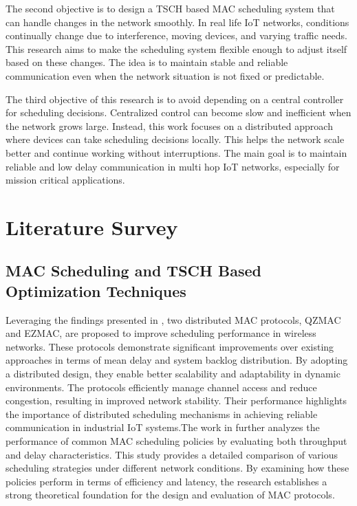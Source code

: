 \documentclass[a4paper,fleqn]{cas-dc}
\numberwithin{equation}{section}
\begin{document}
 The second objective is to design a TSCH based MAC scheduling system that can handle changes in the network smoothly. In real life IoT networks, conditions continually change due to interference, moving devices, and varying traffic needs. This research aims to make the scheduling system flexible enough to adjust itself based on these changes. The idea is to maintain stable and reliable communication even when the network situation is not fixed or predictable.
 
The third objective of this research is to avoid depending on a central controller for scheduling decisions. Centralized control can become slow and inefficient when the network grows large. Instead, this work focuses on a distributed approach where devices can take scheduling decisions locally. This helps the network scale better and continue working without interruptions. The main goal is to maintain reliable and low delay communication in multi hop IoT networks, especially for mission critical applications.

\section{Literature Survey}
\subsection{MAC Scheduling and TSCH Based Optimization Techniques}

Leveraging the findings presented in \cite{mohan2024low}, two distributed MAC protocols, QZMAC and EZMAC, are proposed to improve scheduling performance in wireless networks. These protocols demonstrate significant improvements over existing approaches in terms of mean delay and system backlog distribution. By adopting a distributed design, they enable better scalability and adaptability in dynamic environments. The protocols efficiently manage channel access and reduce congestion, resulting in improved network stability. Their performance highlights the importance of distributed scheduling mechanisms in achieving reliable communication in industrial IoT systems.The work in \cite{zhang2022research} further analyzes the performance of common MAC scheduling policies by evaluating both throughput and delay characteristics. This study provides a detailed comparison of various scheduling strategies under different network conditions. By examining how these policies perform in terms of efficiency and latency, the research establishes a strong theoretical foundation for the design and evaluation of MAC protocols. 
\end{document}
